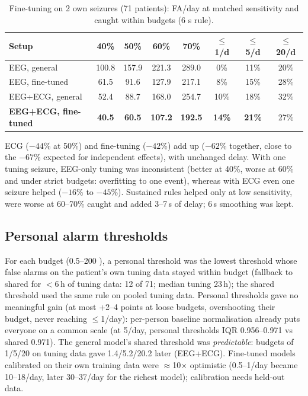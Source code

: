 \begin{table}[H]
\centering\small
\caption{Fine-tuning on 2 own seizures (71 patients): FA/day at matched sensitivity and caught within budgets (6 s rule).}
\begin{tabular}{@{}lccccccc@{}}
\toprule
Setup & 40\% & 50\% & 60\% & 70\% & $\le$1/d & $\le$5/d & $\le$20/d \\
\midrule
EEG, general & 100.8 & 157.9 & 221.3 & 289.0 & 0\% & 11\% & 20\% \\
EEG, fine-tuned & 61.5 & 91.6 & 127.9 & 217.1 & 8\% & 15\% & 28\% \\
EEG+ECG, general & 52.4 & 88.7 & 168.0 & 254.7 & 10\% & 18\% & 32\% \\
\textbf{EEG+ECG, fine-tuned} & \textbf{40.5} & \textbf{60.5} & \textbf{107.2} & \textbf{192.5} & \textbf{14\%} & \textbf{21\%} & 27\% \\
\bottomrule
\end{tabular}
\end{table}

ECG ($-44$\% at 50\%) and fine-tuning ($-42$\%) add up ($-62$\% together, close to the $-67$\% expected for independent effects), with unchanged delay. With one tuning seizure, EEG-only tuning was inconsistent (better at 40\%, worse at 60\% and under strict budgets: overfitting to one event), whereas with ECG even one seizure helped ($-16$\% to $-45$\%). Sustained rules helped only at low sensitivity, were worse at 60--70\% caught and added 3--7\,s of delay; 6\,s smoothing was kept.

\subsection{Personal alarm thresholds}

For each budget (0.5--200 \FAd), a personal threshold was the lowest threshold whose false alarms on the patient's own tuning data stayed within budget (fallback to shared for $<$6\,h of tuning data: 12 of 71; median tuning 23\,h); the shared threshold used the same rule on pooled tuning data. Personal thresholds gave no meaningful gain (at most +2--4 points at loose budgets, overshooting their budget, never reaching $\le$1/day): per-person baseline normalisation already puts everyone on a common scale (at 5/day, personal thresholds IQR 0.956--0.971 vs shared 0.971). The general model's shared threshold was \emph{predictable}: budgets of 1/5/20 on tuning data gave 1.4/5.2/20.2 \FAd{} later (EEG+ECG). Fine-tuned models calibrated on their own training data were $\approx$10$\times$ optimistic (0.5--1/day became 10--18/day, later 30--37/day for the richest model); calibration needs held-out data.

